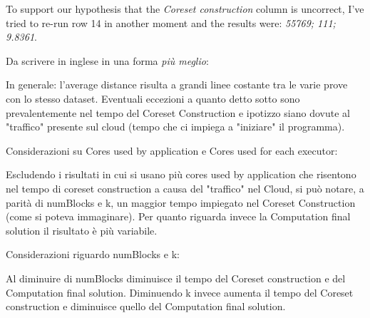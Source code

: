 \documentclass[10pt]{article}
\begin{document}
To support our hypothesis that the \textit{Coreset construction} column is uncorrect, I've tried to re-run row 14 in another moment and the results were: \textit{55769; 111; 9.8361}.

Da scrivere in inglese in una forma \textit{pi\`{u} meglio}:

In generale: l'average distance risulta a grandi linee costante tra le varie prove con lo stesso dataset. Eventuali eccezioni a quanto detto sotto sono prevalentemente nel tempo del Coreset Construction e ipotizzo siano dovute al "traffico" presente sul cloud (tempo che ci impiega a "iniziare" il programma).

Considerazioni su Cores used by application e Cores used for each executor:

Escludendo i risultati in cui si usano pi\`{u} cores used by application che risentono nel tempo di coreset construction a causa del "traffico" nel Cloud, si pu\`{o} notare, a parità di numBlocks e k, un maggior tempo impiegato nel Coreset Construction (come si poteva immaginare). Per quanto riguarda invece la Computation final solution il risultato è più variabile.

Considerazioni riguardo numBlocks e k:

Al diminuire di numBlocks diminuisce il tempo del Coreset construction e del Computation final solution. Diminuendo k invece aumenta il tempo del Coreset construction e diminuisce quello del Computation final solution.
\end{document}
